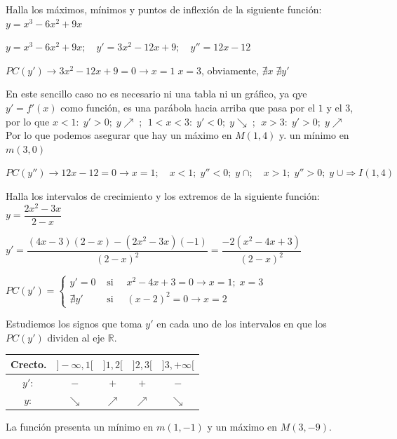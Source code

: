 	
	
	\begin{ejre} Halla los máximos, mínimos y puntos de inflexión de la siguiente función: $ y=x^3-6x^2+9x$
		
	\end{ejre}
	
	\begin{proofw}\renewcommand{\qedsymbol}{$\diamond$}
	
	
	$y=x^3-6x^2+9x; \quad y'=3x^2-12x+9; \quad y''=12x-12$
	
	$PC(y') \to 3x^2-12x+9 =0 \to x=1 \; x=3$, obviamente, $\nexists x \; \nexists y'$
	
	En este sencillo caso no es necesario ni una tabla ni un gráfico, ya qye $y'=f'(x)$ como función, es una parábola hacia arriba que pasa por el $1$ y el $3$, por lo que $x<1:\; y'>0;\; y \nearrow\; $; $\; 1<x<3:\; y'<0;\; y \searrow\; $; $\; x>3:\; y'>0;\; y \nearrow\; $ Por lo que podemos asegurar que hay un máximo en $M(1,4)$ y. un mínimo en $m(3,0)$
	
	$PC(y'') \to 12x-12=0 \to x=1;\quad x<1; \; y''<0; \; y\; \cap ; \quad  x>1; \; y''>0; \; y\; \cup \Rightarrow I(1,4)$
	
	\end{proofw}
	
	\begin{ejre} Halla los intervalos de crecimiento y los extremos de la siguiente función: $ y=\dfrac {2x^2-3x}{2-x}$
		
	\end{ejre}
	
	\begin{proofw}\renewcommand{\qedsymbol}{$\diamond$}
	
	$y'=\dfrac {(4x-3)(2-x)-(2x^2-3x)(-1)}{(2-x)^2}=\dfrac {-2(x^2-4x+3)}{(2-x)^2}$
	
	$PC(y')=\begin{cases}
	 y'=0  & \mbox { si   } \quad x^2-4x+3=0 \to x=1; \; x=3 \\
	 \nexists y'  & \mbox { si   } \quad  (x-2)^2=0 \to x=2 
	\end{cases}$
	
	Estudiemos los signos que toma $y'$ en cada uno de los intervalos en que los $PC(y')$ dividen al eje $\mathbb R$.
	
	\begin{table}[H]
	\centering
	\begin{tabular}{|c|c|c|c|c|}
	\hline
 	Crecto.& $]-\infty,1[$ & $]1,2[$ & $]2,3[$ & $]3,+\infty[$ \\ \hline
	$y':$& $-$  & $+$  & $+$  & $-$  \\ \hline
 	$y:$& $\searrow$ & $\nearrow$ & $\nearrow$ & $\searrow$ \\ \hline
	\end{tabular}
	\end{table}
	
	La función presenta un mínimo en $m(1,-1)$ y un máximo en $M(3,-9)$.
	\end{proofw}
	
